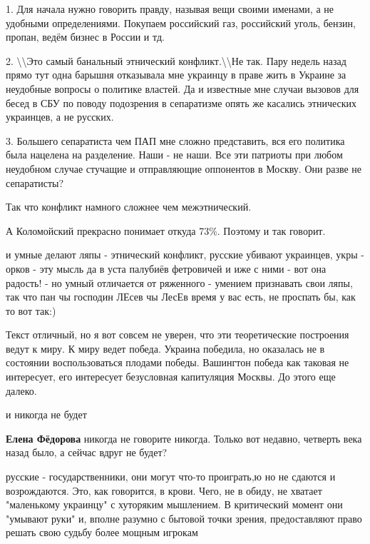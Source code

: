 \begin{itemize}

1. Для начала нужно говорить правду, называя вещи своими именами, а не удобными
определениями. Покупаем российский газ, российский уголь, бензин, пропан, ведём
бизнес в России и тд.

2. \textbackslash\textbackslash Это самый банальный этнический
конфликт.\textbackslash\textbackslash Не так. Пару недель назад прямо тут одна
барышня отказывала мне украинцу в праве жить в Украине за неудобные вопросы о
политике властей. Да и известные мне случаи вызовов для бесед в СБУ по поводу
подозрения в сепаратизме опять же касались этнических украинцев, а не русских.

3. Большего сепаратиста чем ПАП мне сложно представить, вся его политика была
нацелена на разделение. Наши - не наши. Все эти патриоты при любом неудобном
случае стучащие и отправляющие оппонентов в Москву. Они разве не сепаратисты?

Так что конфликт намного сложнее чем межэтнический.

А Коломойский прекрасно понимает откуда 73\%. Поэтому и так говорит.


и умные делают ляпы - этнический конфликт, русские убивают украинцев, укры -
орков - эту мысль да в уста палубиёв фетровичей и иже с ними - вот она радость!
- но умный отличается от ряженного - умением признавать свои ляпы, так что пан
чы господин ЛЕсев чы ЛесЕв время у вас есть, не проспать бы, как то вот так:)


Текст отличный, но я вот совсем не уверен, что эти теоретические построения
ведут к миру. К миру ведет победа. Украина победила, но оказалась не в
состоянии воспользоваться плодами победы. Вашингтон победа как таковая не
интересует, его интересует безусловная капитуляция Москвы. До этого еще далеко.

\begin{itemize} %
и никогда не будет

\textbf{Елена Фёдорова} никогда не говорите никогда. Только вот недавно, четверть века назад было, а сейчас вдруг не будет?


русские - государственники, они могут что-то проиграть,ю но не сдаются и
возрождаются. Это, как говорится, в крови. Чего, не в обиду, не хватает
"маленькому украинцу" с хуторяким мышлением. В критический момент они "умывают
руки" и, вполне разумно с бытовой точки зрения, предоставляют право решать свою
судьбу более мощным игрокам


\end{itemize}
\end{itemize}
